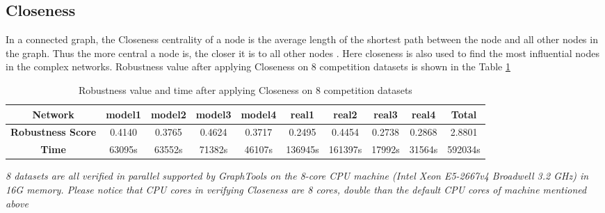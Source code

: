 \documentclass{article}
\begin{document}
	\subsection{Closeness}	
	
	
	In a connected graph, the Closeness centrality of a node is the average length of the shortest path between the node and all other nodes in the graph. Thus the more central a node is, the closer it is to all other nodes \cite{wikiClosenesscentrality}\cite{bavelas1950communication} . Here closeness is also used to find the most influential nodes in the complex networks. Robustness value after applying Closeness on 8 competition datasets is shown in the Table \ref{tab:table3}
	
	\begin{table}[]
		\begin{adjustwidth}{-1.3cm}{}		
			\begin{threeparttable}
				\centering
				\caption{Robustness value and time after applying Closeness on 8 competition datasets}
				\label{tab:table3}
				
				\begin{tabular}{|c|c|c|c|c|c|c|c|c|c|}
					\hline
					\textbf{Network}          & \textbf{model1} & \textbf{model2} & \textbf{model3} & \textbf{model4} & \textbf{real1} & \textbf{real2} & \textbf{real3} & \textbf{real4} & \textbf{Total} \\ \hline
					\textbf{Robustness Score} & 0.4140          & 0.3765          & 0.4624          & 0.3717          & 0.2495         & 0.4454         & 0.2738         & 0.2868         & 2.8801         \\ \hline
					\textbf{Time}     & 63095s           & 63552s           & 71382s           & 46107s           & 136945s         & 161397s         & 17992s          & 31564s          & 592034s         \\ \hline								
				\end{tabular}
				\begin{tablenotes}
					\small
					\item\textit{8 datasets are all verified in parallel supported by GraphTools \cite{peixotographtool2014} on the 8-core CPU machine (Intel Xeon E5-2667v4 Broadwell 3.2 GHz) in 16G memory. Please notice that CPU cores in verifying Closeness are 8 cores, double than the default CPU cores of machine mentioned above}
				\end{tablenotes}			
			\end{threeparttable}
		\end{adjustwidth}
	\end{table}
	
\end{document}
